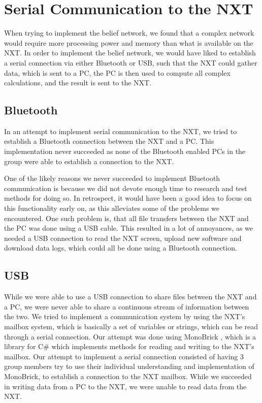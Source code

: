 \section{Serial Communication to the NXT}
When trying to implement the belief network, we found that a complex
network would require more processing power and memory than
what is available on the NXT. In order to implement the belief network,
we would have liked to establish a serial connection via either Bluetooth or
USB, such that the NXT could gather data, which is sent to a PC, the PC is then
used to compute all complex calculations, and the result is sent to the
NXT.

\subsection{Bluetooth}
In an attempt to implement serial communication to the NXT, we tried to
establish a Bluetooth connection between the NXT and a PC. This implementation
never succeeded as none of the Bluetooth enabled PCs in the group were able to
establish a connection to the NXT.\nl

One of the likely reasons we never succeeded to implement Bluetooth
communication is because we did not devote enough time to research and test
methods for doing so. In retrospect, it would have been a good idea to focus
on this functionality early on, as this alleviates some of the problems we
encountered. One such problem is, that all file transfers between the NXT and
the PC was done using a USB cable. 
This resulted in a lot of annoyances, as we needed a USB connection to read the
NXT screen, upload new software and download data logs, which could all be done
using a Bluetooth connection.

\subsection{USB}
While we were able to use a USB connection to share files between the NXT and a
PC, we were never able to share a continuous stream of information between the
two. We tried to implement a communication system by using the NXT's mailbox
system, which is basically a set of variables or strings, which can be read
through a serial connection. Our attempt was done using MonoBrick
\cite{MonoBrick}, which is a library for C\# which implements methods for
reading and writing to the NXT's mailbox. Our attempt to implement a serial
connection consisted of having 3 group members try to use their individual
understanding and implementation of MonoBrick, to establish a connection to the
NXT mailbox. While we succeeded in writing data from a PC to the NXT, we were
unable to read data from the NXT.

